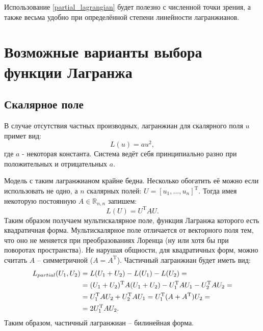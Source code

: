 Использование \ref{partial_lagrangian} будет полезно с численной точки зрения, а также весьма удобно при определённой степени линейности лагранжианов.

\section{Возможные варианты выбора функции Лагранжа}
\subsection{Скалярное поле}
В случае отсутствия частных производных, лагранжиан для скалярного поля $u$ примет вид:
\begin{equation}
	L(u) = au^2,
	\label{L_scalar}
\end{equation}
где $a$ - некоторая константа. Система ведёт себя принципиально разно при положительных и отрицательных $a$.

Модель с таким лагранжианом крайне бедна. Несколько обогатить её можно если использовать не одно, а $n$ скалярных полей:
$U = [u_1, ..., u_n]^\mathrm{T}$. Тогда имея некоторую постоянную $A \in \mathbb{R}_{n,n}$ запишем:
\begin{equation}
	L(U) = U^\mathrm{T}AU.
	\label{L_multiscalar}
\end{equation}
Таким образом получаем мультискалярное поле, функция Лагранжа которого есть квадратичная форма.
Мультискалярное поле отличается от векторного поля тем, что оно не меняется при преобразованиях Лоренца (ну или хотя бы при поворотах пространства).
Не нарушая общности, для квадратичных форм, можно считать $A$ -- симметричной ($A = A^\mathrm{T}$). Частичный лагранжиан будет иметь вид:
\begin{align}
	L_{partial}(U_1, U_2) &= L(U_1 + U_2) - L(U_1) - L(U_2) = \notag \\
						   &= (U_1+U_2)^\mathrm{T}A(U_1+U_2) - U_1^\mathrm{T}AU_1 - U_2^\mathrm{T}AU_2 = \notag \\
						   &=U_1^\mathrm{T}AU_2 + U_2^\mathrm{T}AU_1 = U_1^\mathrm{T}(A+A^\mathrm{T})U_2 = \notag \\
						   &=2U_1^\mathrm{T}AU_2.
	\label{L_partial_multiscalar}
\end{align}
Таким образом, частичный лагранжиан -- билинейная форма.

